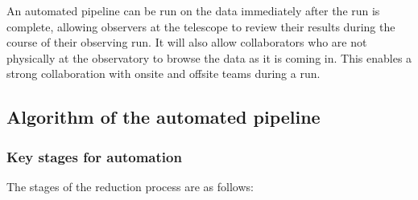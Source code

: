 An automated pipeline can be run on the data immediately after the run is complete, allowing observers at the telescope to review their results during the course of their observing run. It will also allow collaborators who are not physically at the observatory to browse the data as it is coming in. This enables a strong collaboration with onsite and offsite teams during a run. 

\subsection{Algorithm of the automated pipeline} 

\subsubsection{Key stages for automation}
The stages of the reduction process are as follows:
